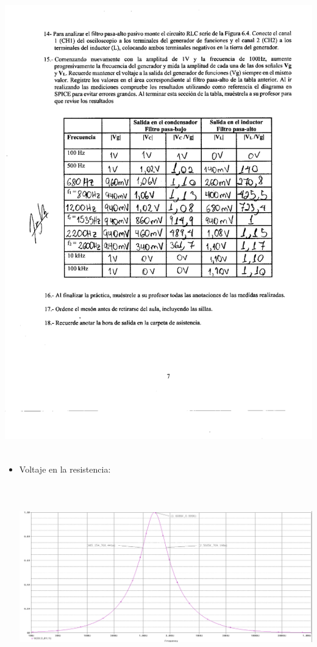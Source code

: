 \documentclass[12pt]{article}
\begin{document}
\begin{enumerate}
    	\begin{center}
    		\includegraphics[width=16cm,height=20cm]{Img/prac_0004}
    	\end{center}
    	
    	\begin{itemize}
    		\item Voltaje en la resistencia:
    		
    		\begin{center}
    			\includegraphics[width=16cm,height=8cm]{Img/vr}
    		\end{center}
    		

\end{itemize}
\end{enumerate}
\end{document}
